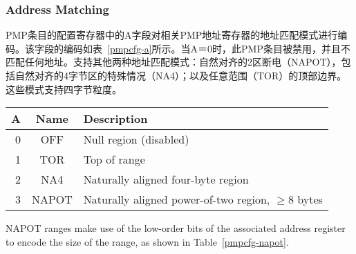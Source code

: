 {\subsubsection*{Address Matching}

\iffalse
The A field in a PMP entry's configuration register encodes the
address-matching mode of the associated PMP address register.  The encoding of
this field is shown in Table~\ref{pmpcfg-a}.  When A=0, this PMP entry is
disabled and matches no addresses.  Two other address-matching modes are
supported: naturally aligned power-of-2 regions (NAPOT), including the special
case of naturally aligned four-byte regions (NA4); and the top boundary of an
arbitrary range (TOR).  These modes support four-byte granularity.
\fi
PMP条目的配置寄存器中的A字段对相关PMP地址寄存器的地址匹配模式进行编码。该字段的编码如表~\ref{pmpcfg-a}所示。当A＝0时，此PMP条目被禁用，并且不匹配任何地址。支持其他两种地址匹配模式：自然对齐的2区断电（NAPOT），包括自然对齐的4字节区的特殊情况（NA4）；以及任意范围（TOR）的顶部边界。这些模式支持四字节粒度。


\begin{table*}[h!]
\begin{center}
\begin{tabular}{|r|c|l|}
\hline
A & Name & Description \\
\hline
0 & OFF   & Null region (disabled) \\
1 & TOR   & Top of range \\
2 & NA4   & Naturally aligned four-byte region \\
3 & NAPOT & Naturally aligned power-of-two region, $\ge$8 bytes \\
\hline
\end{tabular}
\end{center}
\caption{Encoding of A field in PMP configuration registers.}
\label{pmpcfg-a}
\end{table*}

NAPOT ranges make use of the low-order bits of the associated address register
to encode the size of the range, as shown in Table~\ref{pmpcfg-napot}.

}
